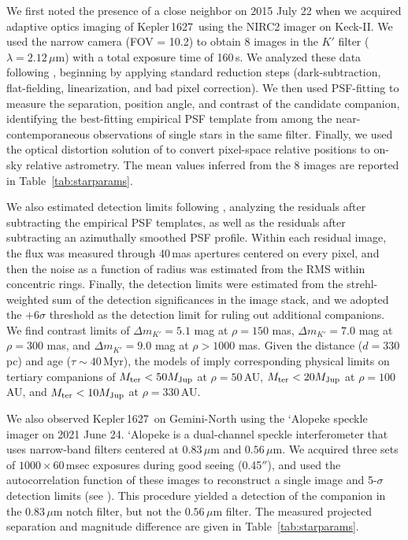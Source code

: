 \documentclass[12pt,modern,twocolumn,tighten]{aastex63}
\newcommand{\sn}{Kepler\,1627} %
\begin{document}
We first noted the presence of a close neighbor on 2015 July 22 when
we acquired adaptive optics imaging of \sn\ using the NIRC2 imager on
Keck-II. We used the narrow camera (FOV = 10.2\arcsec) to obtain 8
images in the $K'$ filter ($\lambda = 2.12\,\mu$m) with a total
exposure time of 160\,s. We analyzed these data following
\citet{kraus_impact_2016}, beginning by applying standard reduction
steps (dark-subtraction, flat-fielding, linearization, and bad pixel
correction). We then used PSF-fitting to measure the separation,
position angle, and contrast of the candidate companion, identifying
the best-fitting empirical PSF template from among the
near-contemporaneous observations of single stars in the same filter.
Finally, we used the optical distortion solution of \citet{yelda_2010}
to convert pixel-space relative positions to on-sky relative
astrometry. The mean values inferred from the 8 images are reported in
Table~\ref{tab:starparams}.

We also estimated detection limits following
\citet{kraus_impact_2016}, analyzing the residuals after subtracting
the empirical PSF templates, as well as the residuals after
subtracting an azimuthally smoothed PSF profile. Within each residual
image, the flux was measured through 40\,mas apertures centered on
every pixel, and then the noise as a function of radius was estimated
from the RMS within concentric rings. Finally, the detection limits
were estimated from the strehl-weighted sum of the detection
significances in the image stack, and we adopted the $+6\sigma$
threshold as the detection limit for ruling out additional companions.
We find contrast limits of $\Delta m_{K'} = 5.1$ mag at $\rho = 150$ mas,
$\Delta m_{K'} = 7.0$ mag at $\rho = 300$ mas, and $\Delta m_{K'} = 9.0$ mag
at $\rho > 1000$ mas.  Given the distance ($d = 330$\,pc) and age
($\tau \sim 40$\,Myr), the models of \citet{chabrier_2000} imply
corresponding physical limits on tertiary companions of $M_{\rm ter} < 50
M_{\rm Jup}$ at $\rho = 50$\,AU, $M_{\rm ter} < 20 M_{\rm Jup}$ at $\rho =
100$\,AU, and $M_{\rm ter} < 10 M_{\rm Jup}$ at $\rho = 330$\,AU.

We also observed \sn\ on Gemini-North using the `Alopeke speckle
imager on 2021 June 24.  `Alopeke is a dual-channel speckle
interferometer that uses narrow-band filters centered at 0.83\,$\mu$m
and $0.56\,\mu$m.  We acquired three sets of $1000\times 60$$\,$msec
exposures during good seeing (0.45$''$), and used the autocorrelation
function of these images to reconstruct a single image and 5-$\sigma$
detection limits (see \citealt{howell_speckle_2011}).  This procedure
yielded a detection of the companion in the 0.83\,$\mu$m notch filter,
but not the $0.56\,\mu$m filter.  The measured projected separation
and magnitude difference are given in Table~\ref{tab:starparams}.
\end{document}
